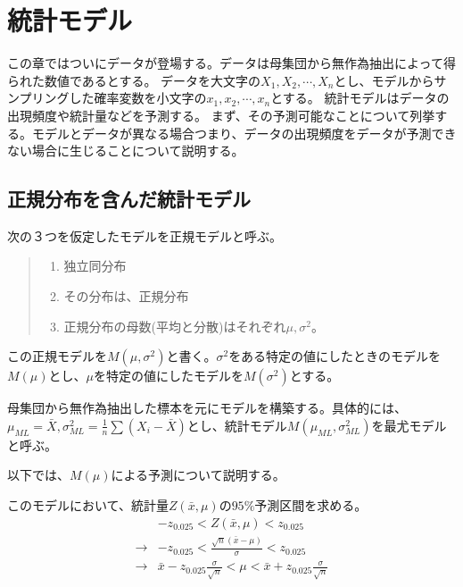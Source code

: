 \chapter{統計モデル}
この章ではついにデータが登場する。データは母集団から無作為抽出によって得られた数値であるとする。
データを大文字の$X_1,X_2,\cdots,X_n$とし、モデルからサンプリングした確率変数を小文字の$x_1,x_2,\cdots,x_n$とする。
統計モデルはデータの出現頻度や統計量などを予測する。
まず、その予測可能なことについて列挙する。モデルとデータが異なる場合つまり、データの出現頻度をデータが予測できない場合に生じることについて説明する。

\section{正規分布を含んだ統計モデル}
次の３つを仮定したモデルを正規モデルと呼ぶ。
\begin{quote}
    \begin{enumerate}[(1)]
    \item 独立同分布
    \item その分布は、正規分布
    \item 正規分布の母数(平均と分散)はそれぞれ$\mu,\sigma^2$。
    \end{enumerate}
\end{quote}
この正規モデルを$M(\mu,\sigma^2)$と書く。$\sigma^2$をある特定の値にしたときのモデルを$M(\mu)$とし、$\mu$を特定の値にしたモデルを$M(\sigma^2)$とする。

母集団から無作為抽出した標本を元にモデルを構築する。具体的には、$\mu_{ML}=\bar{X},\sigma^2_{ML}=\frac{1}{n}\sum(X_i-\bar{X})$とし、統計モデル$M(\mu_{ML},\sigma^2_{ML})$を最尤モデルと呼ぶ。

以下では、$M(\mu)$による予測について説明する。

このモデルにおいて、統計量$Z(\bar{x},\mu)$の$95\%$予測区間を求める。
\begin{eqnarray*}
 & -z_{0.025} < Z(\bar{x},\mu)<z_{0.025} \\
\rightarrow & -z_{0.025} < \frac{\sqrt{n}(\bar{x}-\mu)}{\sigma}  <z_{0.025} \\
\rightarrow & \bar{x}- z_{0.025}\frac{\sigma}{\sqrt{n}} < \mu < \bar{x} + z_{0.025}\frac{\sigma}{\sqrt{n}}
\end{eqnarray*}
\fi

